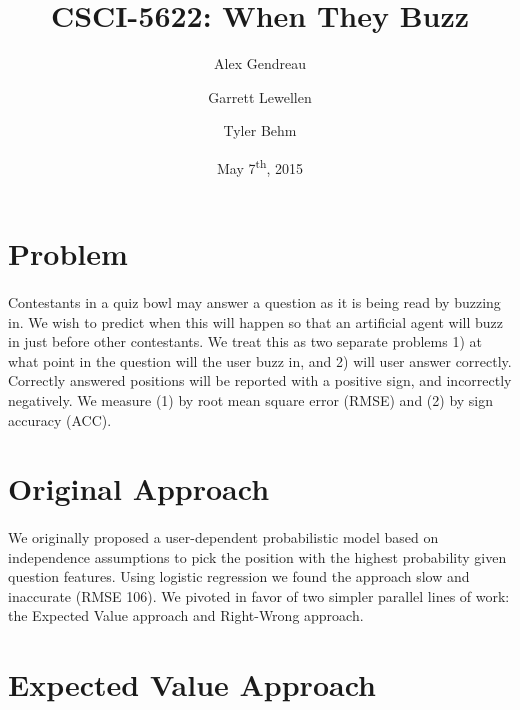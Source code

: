 \documentclass[letterpaper]{article}
\begin{document}
\title{CSCI-5622: When They Buzz}
\author{Alex Gendreau \and Garrett Lewellen \and Tyler Behm}
\date{May 7\textsuperscript{th}, 2015}

\maketitle

\section*{Problem}

\paragraph{} Contestants in a quiz bowl may answer a question as it is being read by buzzing in. We wish to predict when this will happen so that an artificial agent will buzz in just before other contestants. We treat this as two separate problems 1) at what point in the question will the user buzz in, and 2) will user answer correctly. Correctly answered positions will be reported with a positive sign, and incorrectly negatively. We measure (1) by root mean square error (RMSE) and (2) by sign accuracy (ACC).

\section*{Original Approach}

\paragraph{} We originally proposed a user-dependent probabilistic model based on independence assumptions to pick the position with the highest probability given question features. Using logistic regression we found the approach slow and inaccurate (RMSE 106). We pivoted in favor of two simpler parallel lines of work: the Expected Value approach and Right-Wrong approach.

\section*{Expected Value Approach}
\end{document}

